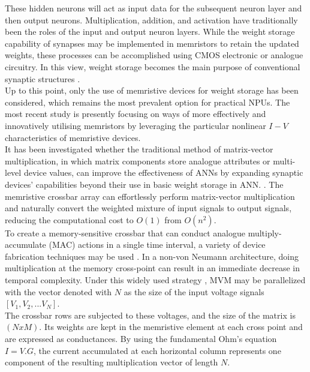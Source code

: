 \noindent These hidden neurons will act as input data for the subsequent neuron layer and then output neurons. Multiplication, addition, and activation have traditionally been the roles of the input and output neuron layers. While the weight storage capability of synapses may be implemented in memristors to retain the updated weights, these processes can be accomplished using CMOS electronic or analogue circuitry. In this view, weight storage becomes the main purpose of conventional synaptic structures \cite{schemmel2008wafer}. \\

\noindent Up to this point, only the use of memristive devices for weight storage has been considered, which remains the most prevalent option for practical NPUs. The most recent study is presently focusing on ways of more effectively and innovatively utilising memristors by leveraging the particular nonlinear $I-V$ characteristics of memristive devices. \\

\noindent It has been investigated whether the traditional method of matrix-vector multiplication, in which matrix components store analogue attributes or multi-level device values, can improve the effectiveness of ANNs by expanding synaptic devices' capabilities beyond their use in basic weight storage in ANN. \cite{wu2012alox}. The memristive crossbar array can effortlessly perform matrix-vector multiplication and naturally convert the weighted mixture of input signals to output signals, reducing the computational cost to $O(1)$ from $O(n^2)$. \\

\noindent To create a memory-sensitive crossbar that can conduct analogue multiply-accumulate (MAC) actions in a single time interval, a variety of device fabrication techniques may be used \cite{rahimi2020complementary}. In a non-von Neumann architecture, doing multiplication at the memory cross-point can result in an immediate decrease in temporal complexity. Under this widely used strategy \cite{xia2019memristive}, MVM may be parallelized with the vector denoted with $N$ as the size of the input voltage signals $[V_1,V_2,...V_N]$. \\

\noindent The crossbar rows are subjected to these voltages, and the size of the matrix is $(N x M)$. Its weights are kept in the memristive element at each cross point and are expressed as conductances. By using the fundamental Ohm's equation $I=V.G$, the current accumulated at each horizontal column represents one component of the resulting multiplication vector of length $N$.\\

